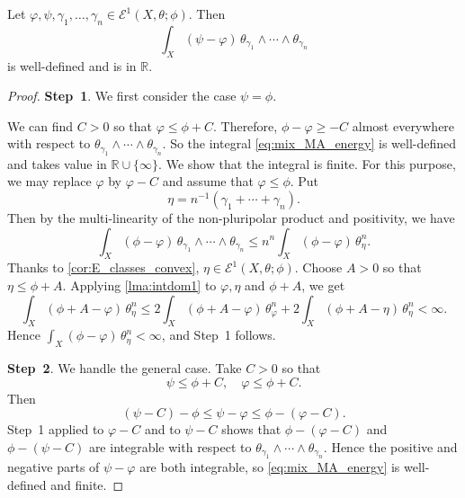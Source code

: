 \begin{corollary}\label{cor:mix_MA_energy_finite}
    Let $\varphi,\psi,\gamma_1,\ldots,\gamma_n\in \mathcal{E}^1(X,\theta;\phi)$. Then
    \begin{equation}\label{eq:mix_MA_energy}
        \int_X (\psi-\varphi)\,\theta_{\gamma_1}\wedge \cdots \wedge \theta_{\gamma_n}
    \end{equation}
    is well-defined and is in $\mathbb{R}$.
\end{corollary}
\begin{proof}
    \textbf{Step~1}. We first consider the case $\psi=\phi$.

    We can find $C>0$ so that $\varphi\leq \phi+C$. Therefore, $\phi-\varphi \geq -C$ almost everywhere with respect to $\theta_{\gamma_1}\wedge \cdots \wedge \theta_{\gamma_n}$. So the integral \eqref{eq:mix_MA_energy} is well-defined and takes value in $\mathbb{R}\cup \{\infty\}$. We show that the integral is finite. For this purpose, we may replace $\varphi$ by $\varphi-C$ and assume that $\varphi\leq \phi$. Put
    \[
        \eta=n^{-1}(\gamma_1+\cdots+\gamma_n).
    \]
    Then by the multi-linearity of the non-pluripolar product  and positivity, we have
    \[
        \int_X (\phi-\varphi)\,\theta_{\gamma_1}\wedge \cdots \wedge \theta_{\gamma_n}\leq n^n\int_X (\phi-\varphi)\,\theta_{\eta}^n.
    \]
    Thanks to \cref{cor:E_classes_convex}, $\eta\in \mathcal{E}^1(X,\theta;\phi)$. Choose $A>0$ so that $\eta\leq \phi+A$. Applying \cref{lma:intdom1} to $\varphi,\eta$ and $\phi+A$, we get
    \[
        \int_X(\phi+A-\varphi)\,\theta_{\eta}^n
        \leq 2\int_X(\phi+A-\varphi)\,\theta_{\varphi}^n
        +2\int_X(\phi+A-\eta)\,\theta_{\eta}^n<\infty.
    \]
    Hence $\int_X(\phi-\varphi)\,\theta_{\eta}^n<\infty$, and Step~1 follows.

    \textbf{Step~2}. We handle the general case. Take $C>0$ so that
    \[
        \psi\leq \phi+C,\quad \varphi\leq \phi+C.
    \]
    Then
    \[
        (\psi-C)-\phi \leq \psi-\varphi\leq \phi-(\varphi-C).
    \]
    Step~1 applied to $\varphi-C$ and to $\psi-C$ shows that $\phi-(\varphi-C)$ and $\phi-(\psi-C)$ are integrable with respect to $\theta_{\gamma_1}\wedge \cdots \wedge \theta_{\gamma_n}$. Hence the positive and negative parts of $\psi-\varphi$ are both integrable, so \eqref{eq:mix_MA_energy} is well-defined and finite.
\end{proof}


